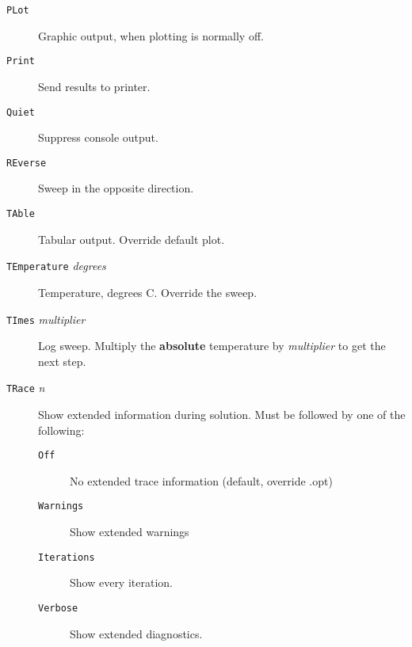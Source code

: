 \begin{description}

\item[{\tt PLot}] Graphic output, when plotting is
normally off.

\item[{\tt Print}] Send results to printer.

\item[{\tt Quiet}] Suppress console output.


\item[{\tt REverse}] Sweep in the opposite direction.

\item[{\tt TAble}] Tabular output. Override default plot.

\item[{\tt TEmperature} {\it degrees}] Temperature,
degrees C.  Override the sweep.

\item[{\tt TImes} {\it multiplier}] Log sweep.  Multiply
the {\bf absolute} temperature by {\it multiplier} to get
the next step.

\item[{\tt TRace} {\it n}] Show extended information during solution.
Must be followed by one of the following:
\begin{description}
\item[{\tt Off}] No extended trace information (default, override .opt)
\item[{\tt Warnings}] Show extended warnings
\item[{\tt Iterations}] Show every iteration.
\item[{\tt Verbose}] Show extended diagnostics.
\end{description}


\end{description}
